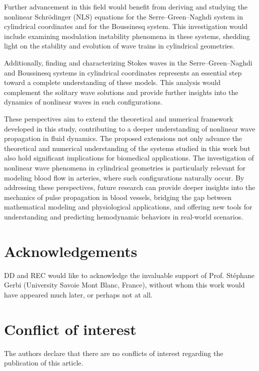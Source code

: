 \documentclass[alpha-refs, 12pt]{wiley-article}
\begin{document}
Further advancement in this field would benefit from deriving and studying the nonlinear Schr\"odinger (NLS) equations for the Serre--Green--Naghdi system in cylindrical coordinates and for the Boussinesq system. This investigation would include examining modulation instability phenomena in these systems, shedding light on the stability and evolution of wave trains in cylindrical geometries.

Additionally, finding and characterizing Stokes waves in the Serre--Green--Naghdi and Boussinesq systems in cylindrical coordinates represents an essential step toward a complete understanding of these models. This analysis would complement the solitary wave solutions and provide further insights into the dynamics of nonlinear waves in such configurations.

These perspectives aim to extend the theoretical and numerical framework developed in this study, contributing to a deeper understanding of nonlinear wave propagation in fluid dynamics. The proposed extensions not only advance the theoretical and numerical understanding of the systems studied in this work but also hold significant implications for biomedical applications. The investigation of nonlinear wave phenomena in cylindrical geometries is particularly relevant for modeling blood flow in arteries, where such configurations naturally occur. By addressing these perspectives, future research can provide deeper insights into the mechanics of pulse propagation in blood vessels, bridging the gap between mathematical modeling and physiological applications, and offering new tools for understanding and predicting hemodynamic behaviors in real-world scenarios.

\vspace*{1.5em}
\section*{Acknowledgements}

DD and REC would like to acknowledge the invaluable support of Prof. St\'ephane Gerbi (University Savoie Mont Blanc, France), without whom this work would have appeared much later, or perhaps not at all.

\section*{Conflict of interest}

The authors declare that there are no conflicts of interest regarding the publication of this article.
\end{document}
